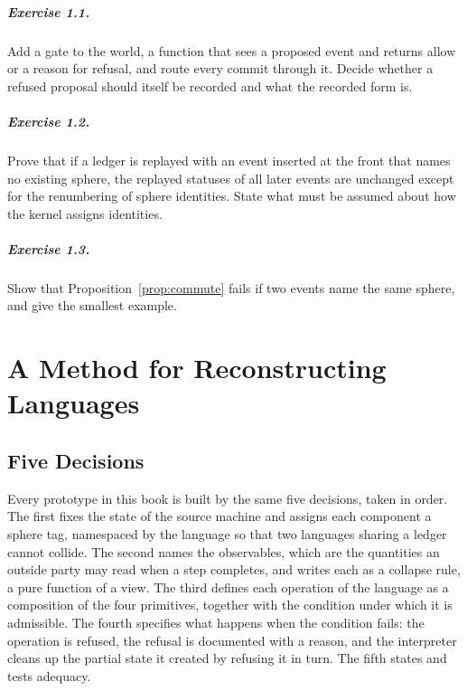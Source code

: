 \paragraph{Exercise 1.1.} Add a gate to the world, a function that sees a proposed event and returns allow or a reason for refusal, and route every commit through it. Decide whether a refused proposal should itself be recorded and what the recorded form is.

\paragraph{Exercise 1.2.} Prove that if a ledger is replayed with an event inserted at the front that names no existing sphere, the replayed statuses of all later events are unchanged except for the renumbering of sphere identities. State what must be assumed about how the kernel assigns identities.

\paragraph{Exercise 1.3.} Show that Proposition~\ref{prop:commute} fails if two events name the same sphere, and give the smallest example.

\chapter{A Method for Reconstructing Languages}

\section{Five Decisions}

Every prototype in this book is built by the same five decisions, taken in order. The first fixes the state of the source machine and assigns each component a sphere tag, namespaced by the language so that two languages sharing a ledger cannot collide. The second names the observables, which are the quantities an outside party may read when a step completes, and writes each as a collapse rule, a pure function of a view. The third defines each operation of the language as a composition of the four primitives, together with the condition under which it is admissible. The fourth specifies what happens when the condition fails: the operation is refused, the refusal is documented with a reason, and the interpreter cleans up the partial state it created by refusing it in turn. The fifth states and tests adequacy.

